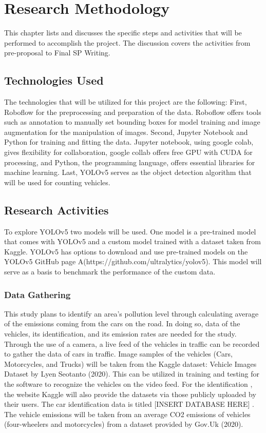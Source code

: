 \chapter{Research Methodology}
This chapter lists and discusses the specific steps and activities that will be performed  to accomplish the project. 
The discussion covers the activities from pre-proposal to Final SP Writing.

\section{Technologies Used}
The technologies that will be utilized for this project are the following: First, Roboflow for the preprocessing and preparation of the data. Roboflow offers tools such as annotation to manually set bounding boxes for model training and image augmentation for the manipulation of images. Second, Jupyter Notebook and Python for training and fitting the data. Jupyter notebook, using google colab, gives flexibility for collaboration,  google collab offers free GPU with CUDA for processing, and Python, the programming language, offers essential libraries for machine learning. Last, YOLOv5 serves as the object detection algorithm that will be used for counting vehicles.

\section{Research Activities}
To explore YOLOv5 two models will be used. One model is a pre-trained model that comes with YOLOv5 and a custom model trained with a dataset taken from Kaggle. YOLOv5 has options to download and use pre-trained models on the YOLOv5 GitHub page A(https://github.com/ultralytics/yolov5). This model will serve as a basis to benchmark the performance of the custom data.

\subsection {Data Gathering}
This study plans to identify an area’s pollution level through calculating average of the emissions coming from the cars on the road. In doing so, data of the vehicles, its identification, and its emission rates are needed for the study. Through the use of a camera, a live feed of the vehicles in traffic can be recorded to gather the data of cars in traffic. Image samples of the vehicles (Cars, Motorcycles, and Trucks) will be taken from the Kaggle dataset: Vehicle Images Dataset by Lyen Seotanto (2020). This can be utilized in training and testing for the software to recognize the vehicles on the video feed. For the identification , the website Kaggle will also provide the datasets via those publicly uploaded by their users. The car identification data is titled [INSERT DATABASE HERE] . The vehicle emissions will be taken from an average CO2 emissions of vehicles (four-wheelers and motorcycles) from a dataset provided by Gov.Uk (2020). 

